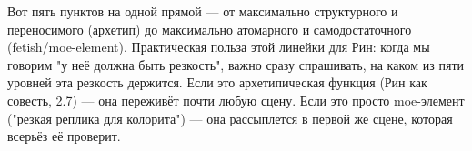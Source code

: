 Вот пять пунктов на одной прямой — от максимально структурного и переносимого (архетип) до максимально атомарного и самодостаточного (fetish/moe-element). Практическая польза этой линейки для Рин: когда мы говорим "у неё должна быть резкость", важно сразу спрашивать, на каком из пяти уровней эта резкость держится. Если это архетипическая функция (Рин как совесть, 2.7) — она переживёт почти любую сцену. Если это просто moe-элемент ("резкая реплика для колорита") — она рассыплется в первой же сцене, которая всерьёз её проверит.

